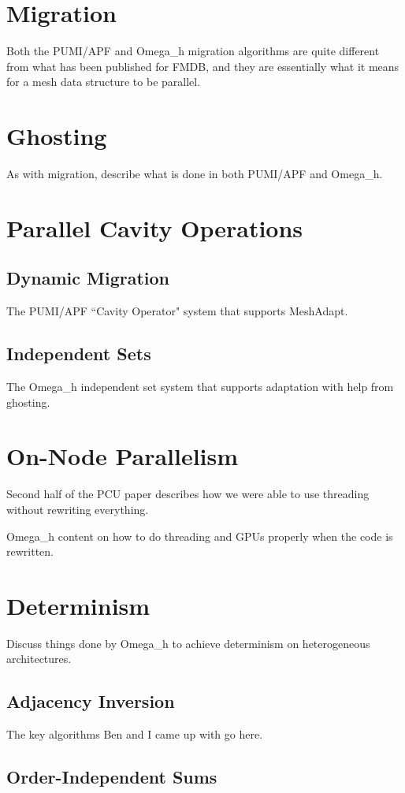 \section{Migration}

Both the PUMI/APF and Omega\_h migration algorithms
are quite different from what has been published for FMDB,
and they are essentially what it means for a mesh
data structure to be parallel.

\section{Ghosting}

As with migration, describe what is done in both PUMI/APF
and Omega\_h.

\section{Parallel Cavity Operations}

\subsection{Dynamic Migration}

The PUMI/APF ``Cavity Operator" system that supports MeshAdapt.

\subsection{Independent Sets}

The Omega\_h independent set system that supports adaptation
with help from ghosting.

\section{On-Node Parallelism}

Second half of the PCU paper describes how we were able to use
threading without rewriting everything.

Omega\_h content on how to do threading and GPUs properly
when the code is rewritten.

\section{Determinism}

Discuss things done by Omega\_h to achieve
determinism on heterogeneous architectures.

\subsection{Adjacency Inversion}

The key algorithms Ben and I came up with go here.

\subsection{Order-Independent Sums}


